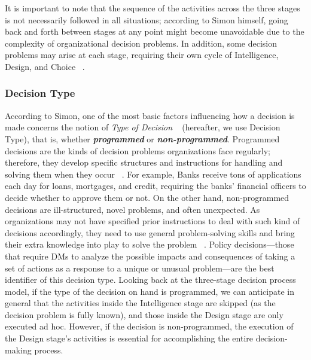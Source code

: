 \documentclass{sfuthesis}
\begin{document}
It is important to note that the sequence of the activities across the three stages is not necessarily followed in all situations; according to Simon himself, going back and forth between stages at any point might become unavoidable due to the complexity of organizational decision problems. In addition, some decision problems may arise at each stage, requiring their own cycle of Intelligence, Design, and Choice ~\cite{simon1960new}.
\subsubsection{Decision Type}
According to Simon, one of the most basic factors influencing how a decision is made concerns the notion of \textit{Type of Decision} ~\cite{simon1960new} (hereafter, we use Decision Type), that is, whether \textit{\textbf{programmed}} or \textit{\textbf{non-programmed}}. Programmed decisions are the kinds of decision problems organizations face regularly; therefore, they develop specific structures and instructions for handling and solving them when they occur ~\cite{simon1960new}. For example, Banks receive tons of applications each day for loans, mortgages, and credit, requiring the banks’ financial officers to decide whether to approve them or not. On the other hand, non-programmed decisions are ill-structured, novel problems, and often unexpected. As organizations may not have specified prior instructions to deal with such kind of decisions accordingly, they need to use general problem-solving skills and bring their extra knowledge into play to solve the problem ~\cite{simon1960new}. Policy decisions—those that require DMs to analyze the possible impacts and consequences of taking a set of actions as a response to a unique or unusual problem—are the best identifier of this decision type. Looking back at the three-stage decision process model, if the type of the decision on hand is programmed, we can anticipate in general that the activities inside the Intelligence stage are skipped (as the decision problem is fully known), and those inside the Design stage are only executed ad hoc. However, if the decision is non-programmed, the execution of the Design stage’s activities is essential for accomplishing the entire decision-making process.
\end{document}
